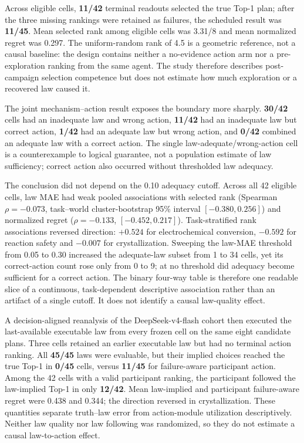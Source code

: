 \documentclass[10pt,twocolumn]{article}
\begin{document}
Across eligible cells, \textbf{11/42} terminal readouts selected the
true Top-1 plan; after the three missing rankings were retained as
failures, the scheduled result was \textbf{11/45}. Mean selected rank
among eligible cells was 3.31/8 and mean normalized regret was 0.297.
The uniform-random rank of 4.5 is a geometric reference, not a causal
baseline: the design contains neither a no-evidence action arm nor a
pre-exploration ranking from the same agent. The study therefore
describes post-campaign selection competence but does not estimate how
much exploration or a recovered law caused it.

The joint mechanism--action result exposes the boundary more sharply.
\textbf{30/42} cells had an inadequate law and wrong action,
\textbf{11/42} had an inadequate law but correct action, \textbf{1/42}
had an adequate law but wrong action, and \textbf{0/42} combined an
adequate law with a correct action. The single law-adequate/wrong-action
cell is a counterexample to logical guarantee, not a population estimate
of law sufficiency; correct action also occurred without thresholded law
adequacy.

The conclusion did not depend on the 0.10 adequacy cutoff. Across all 42
eligible cells, law MAE had weak pooled associations with selected rank
(Spearman \(\rho=-0.073\), task--world cluster-bootstrap 95\% interval
\([-0.380,0.256]\)) and normalized regret (\(\rho=-0.133\),
\([-0.452,0.217]\)). Task-stratified rank associations reversed
direction: \(+0.524\) for electrochemical conversion, \(-0.592\) for
reaction safety and \(-0.007\) for crystallization. Sweeping the law-MAE
threshold from 0.05 to 0.30 increased the adequate-law subset from 1 to
34 cells, yet its correct-action count rose only from 0 to 9; at no
threshold did adequacy become sufficient for a correct action. The
binary four-way table is therefore one readable slice of a continuous,
task-dependent descriptive association rather than an artifact of a
single cutoff. It does not identify a causal law-quality effect.

A decision-aligned reanalysis of the DeepSeek-v4-flash cohort then
executed the last-available executable law from every frozen cell on the
same eight candidate plans. Three cells retained an earlier executable
law but had no terminal action ranking. All \textbf{45/45} laws were
evaluable, but their implied choices reached the true Top-1 in
\textbf{0/45} cells, versus \textbf{11/45} for failure-aware participant
action. Among the 42 cells with a valid participant ranking, the
participant followed the law-implied Top-1 in only \textbf{12/42}. Mean
law-implied and participant failure-aware regret were 0.438 and 0.344;
the direction reversed in crystallization. These quantities separate
truth--law error from action-module utilization descriptively. Neither
law quality nor law following was randomized, so they do not estimate a
causal law-to-action effect.
\end{document}
